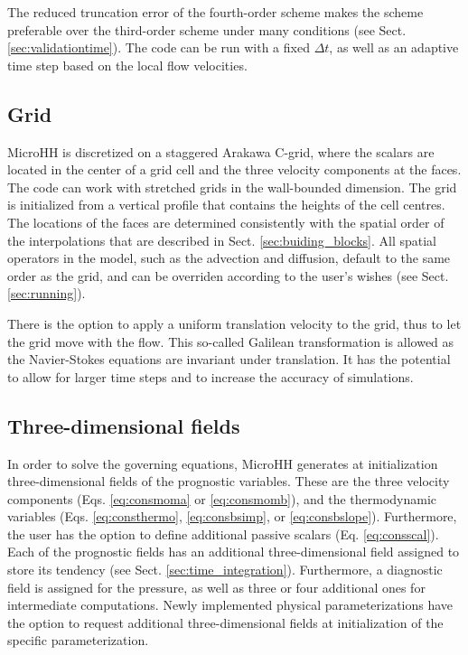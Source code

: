 \documentclass[gmd,manuscript]{copernicus}
\begin{document}
The reduced truncation error of the fourth-order scheme makes the scheme preferable over the third-order scheme under many conditions (see Sect. \ref{sec:validationtime}). The code can be run with a fixed $\Delta t$, as well as an adaptive time step based on the local flow velocities.

\subsection{Grid}\label{sec:grid}
MicroHH is discretized on a staggered Arakawa C-grid, where the scalars are located in the center of a grid cell and the three velocity components at the faces. The code can work with stretched grids in the wall-bounded dimension. The grid is initialized from a vertical profile that contains the heights of the cell centres. The locations of the faces are determined consistently with the spatial order of the interpolations that are described in Sect. \ref{sec:buiding_blocks}. All spatial operators in the model, such as the advection and diffusion, default to the same order as the grid, and can be overriden according to the user's wishes (see Sect. \ref{sec:running}).

There is the option to apply a uniform translation velocity to the grid, thus to let the grid move with the flow. This so-called Galilean transformation is allowed as the Navier-Stokes equations are invariant under translation. It has the potential to allow for larger time steps and to increase the accuracy of simulations.

\subsection{Three-dimensional fields}
In order to solve the governing equations, MicroHH generates at initialization three-dimensional fields of the prognostic variables. These are the three velocity components (Eqs. \ref{eq:consmoma} or \ref{eq:consmomb}), and the thermodynamic variables (Eqs. \ref{eq:consthermo}, \ref{eq:consbsimp}, or \ref{eq:consbslope}). Furthermore, the user has the option to define additional passive scalars (Eq. \ref{eq:consscal}). Each of the prognostic fields has an additional three-dimensional field assigned to store its tendency (see Sect. \ref{sec:time_integration}). Furthermore, a diagnostic field is assigned for the pressure, as well as three or four additional ones for intermediate computations. Newly implemented physical parameterizations have the option to request additional three-dimensional fields at initialization of the specific parameterization.
\end{document}
